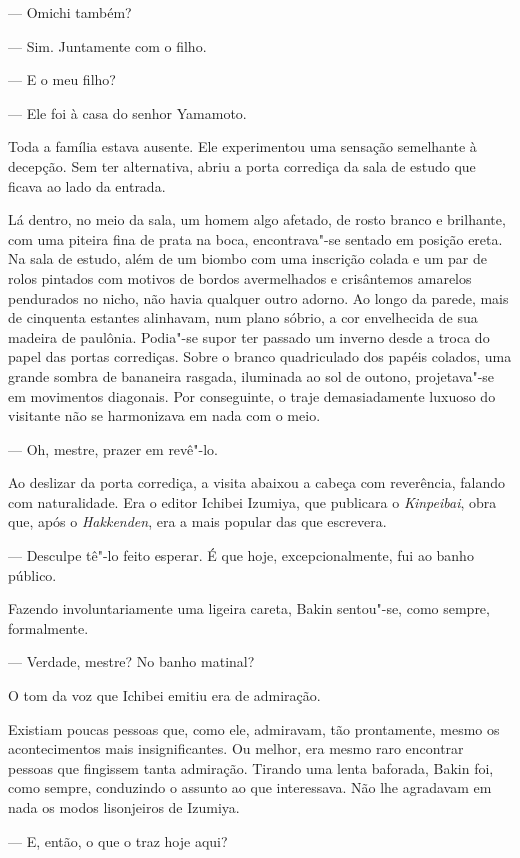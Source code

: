 --- Omichi também?

--- Sim. Juntamente com o filho.

--- E o meu filho?

--- Ele foi à casa do senhor Yamamoto.

Toda a família estava ausente. Ele experimentou uma sensação semelhante
à decepção. Sem ter alternativa, abriu a porta corrediça da sala de
estudo que ficava ao lado da entrada.

Lá dentro, no meio da sala, um homem algo afetado, de rosto branco e 
brilhante, com uma piteira fina de prata na boca, encontrava"-se sentado
em posição ereta. Na sala de estudo, além de um biombo com uma
inscrição colada e um par de rolos pintados com motivos de bordos
avermelhados e crisântemos amarelos pendurados no nicho, não havia
qualquer outro adorno. Ao longo da parede, mais de cinquenta estantes
alinhavam, num plano sóbrio, a cor envelhecida de sua madeira de
paulônia. Podia"-se supor ter passado um inverno desde a troca do papel
das portas corrediças. Sobre o branco quadriculado dos papéis colados,
uma grande sombra de bananeira rasgada, iluminada ao sol de outono,
projetava"-se em movimentos diagonais. Por conseguinte, o traje
demasiadamente luxuoso do visitante não se harmonizava em nada com o meio.

--- Oh, mestre, prazer em revê"-lo.

Ao deslizar da porta corrediça, a visita abaixou a cabeça com
reverência, falando com naturalidade. Era o editor Ichibei Izumiya, que 
publicara o \textit{Kinpeibai}, obra que, após o \textit{Hakkenden},
era a mais popular das que escrevera.

--- Desculpe tê"-lo feito esperar. É que hoje, excepcionalmente, fui ao
banho público.

Fazendo involuntariamente uma ligeira careta, Bakin sentou"-se, como
sempre, formalmente.

--- Verdade, mestre? No banho matinal?

O tom da voz que Ichibei emitiu era de admiração.

Existiam poucas pessoas que, como ele, admiravam, tão prontamente, mesmo
os acontecimentos mais insignificantes. Ou melhor, era mesmo raro
encontrar pessoas que fingissem tanta admiração. Tirando uma lenta
baforada, Bakin foi, como sempre, conduzindo o assunto ao que interessava.
Não lhe agradavam em nada os modos lisonjeiros de Izumiya.

--- E, então, o que o traz hoje aqui?

